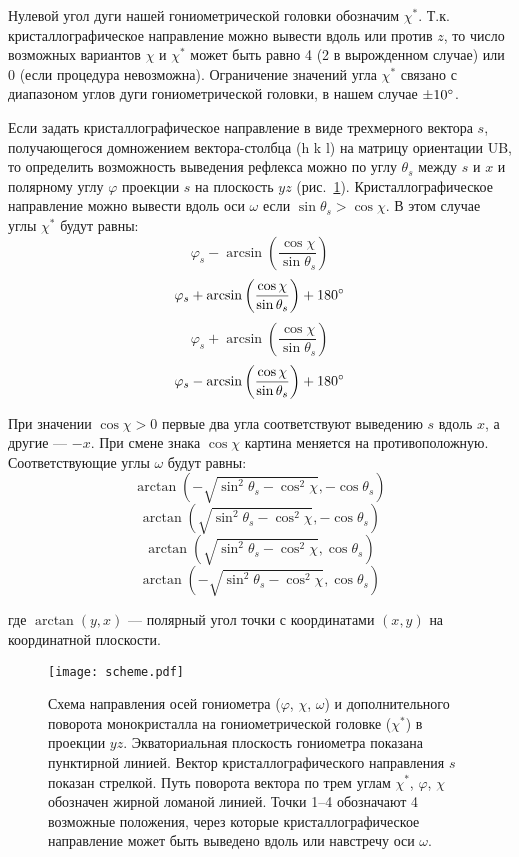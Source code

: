 Нулевой угол дуги нашей гониометрической головки обозначим $\chi^\ast$.
Т.к. кристаллографическое направление можно вывести вдоль или против $z$, то число возможных вариантов $\chi$ и $\chi^\ast$ может быть равно 4 (2 в вырожденном случае) или 0 (если процедура невозможна).
Ограничение значений угла $\chi^\ast$ связано с диапазоном углов дуги гониометрической головки, в нашем случае $\pm 10^\circ$.

Если задать кристаллографическое направление \hkl[h k l] в виде трехмерного вектора $s$, получающегося домножением вектора-столбца \hkl(h k l) на матрицу ориентации UB, то определить возможность выведения рефлекса можно по углу $\theta_s$ между $s$ и $x$ и полярному углу $\varphi$ проекции $s$ на плоскость $yz$ (рис.~\ref{fig:scheme}).
Кристаллографическое направление можно вывести вдоль оси $\omega$ если $\sin{\theta_s} > \cos{\chi}$.
В этом случае углы $\chi^\ast$ будут равны:
\[ \varphi_s - \arcsin\left(\frac{\cos{\chi}}{\sin{\theta_s}}\right) \]
\[ \varphi_s + \arcsin\left(\frac{\cos{\chi}}{\sin{\theta_s}}\right) + 180^\circ \]
\[ \varphi_s + \arcsin\left(\frac{\cos{\chi}}{\sin{\theta_s}}\right) \]
\[ \varphi_s - \arcsin\left(\frac{\cos{\chi}}{\sin{\theta_s}}\right) + 180^\circ \]

При значении $\cos{\chi} > 0$ первые два угла соответствуют выведению $s$ вдоль $x$, а другие --- $-x$. При смене знака $\cos{\chi}$ картина меняется на противоположную.
Соответствующие углы $\omega$ будут равны:
\[\arctan\left(-\sqrt{\sin^2{\theta_s} - \cos^2{\chi}}, -\cos{\theta_s}\right)\]
\[\arctan\left(\sqrt{\sin^2{\theta_s} - \cos^2{\chi}}, -\cos{\theta_s}\right)\]
\[\arctan\left(\sqrt{\sin^2{\theta_s} - \cos^2{\chi}}, \cos{\theta_s}\right)\]
\[\arctan\left(-\sqrt{\sin^2{\theta_s} - \cos^2{\chi}}, \cos{\theta_s}\right)\]

где $\arctan(y, x)$ –-- полярный угол точки с координатами $(x, y)$ на координатной плоскости. 

\begin{figure}[ht!]
    \centering
    \texttt{[image: scheme.pdf]}
    \caption{
        Схема направления осей гониометра ($\varphi$, $\chi$, $\omega$) и дополнительного поворота монокристалла на гониометрической головке ($\chi^\ast$) в проекции $yz$.
        Экваториальная плоскость гониометра показана пунктирной линией.
        Вектор кристаллографического направления $s$ показан стрелкой.
        Путь поворота вектора по трем углам $\chi^\ast$, $\varphi$, $\chi$ обозначен жирной ломаной линией.
        Точки 1--4 обозначают 4 возможные положения, через которые кристаллографическое направление может быть выведено вдоль или навстречу оси $\omega$.
    }%
    \label{fig:scheme}
\end{figure}

